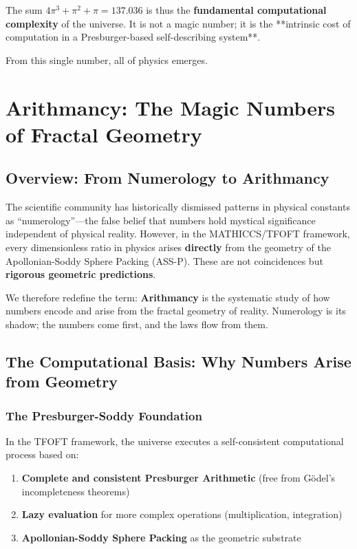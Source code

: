 \documentclass[11pt,a4paper]{article}
\begin{document}
  The sum $4\pi^3 + \pi^2 + \pi = 137.036$ is thus the \textbf{fundamental computational complexity} of the universe. It is not a magic number; it is the **intrinsic cost of computation in a Presburger-based self-describing system**.

  From this single number, all of physics emerges.



\section{Arithmancy: The Magic Numbers of Fractal Geometry}

\subsection{Overview: From Numerology to Arithmancy}

The scientific community has historically dismissed patterns in physical constants as ``numerology''---the false belief that numbers hold mystical significance independent of physical reality. However, in the MATHICCS/TFOFT framework, every dimensionless ratio in physics arises \textbf{directly} from the geometry of the Apollonian-Soddy Sphere Packing (ASS-P). These are not coincidences but \textbf{rigorous geometric predictions}.

We therefore redefine the term: \textbf{Arithmancy} is the systematic study of how numbers encode and arise from the fractal geometry of reality. Numerology is its shadow; the numbers come first, and the laws flow from them.


\subsection{The Computational Basis: Why Numbers Arise from Geometry}

\subsubsection{The Presburger-Soddy Foundation}

In the TFOFT framework, the universe executes a self-consistent computational process based on:

\begin{enumerate}
\item \textbf{Complete and consistent Presburger Arithmetic} (free from Gödel's incompleteness theorems)
\item \textbf{Lazy evaluation} for more complex operations (multiplication, integration)
\item \textbf{Apollonian-Soddy Sphere Packing} as the geometric substrate
\end{enumerate}
\end{document}
